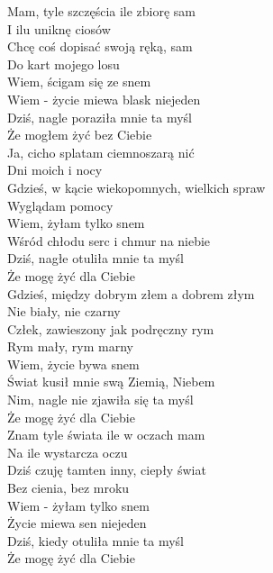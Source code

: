 
Mam, tyle szczęścia ile zbiorę sam \\
I ilu uniknę ciosów \\
Chcę coś dopisać swoją ręką, sam \\
Do kart mojego losu \\
Wiem, ścigam się ze snem \\
Wiem - życie miewa blask niejeden \\
Dziś, nagle poraziła mnie ta myśl \\
Że mogłem żyć bez Ciebie \\
\hops
Ja, cicho splatam ciemnoszarą nić \\
Dni moich i nocy \\
Gdzieś, w kącie wiekopomnych, wielkich spraw \\
Wyglądam pomocy \\
Wiem, żyłam tylko snem \\
Wśród chłodu serc i chmur na niebie \\
Dziś, nagłe otuliła mnie ta myśl \\
Że mogę żyć dla Ciebie \\
\hops
Gdzieś, między dobrym złem a dobrem złym \\
Nie biały, nie czarny \\
Człek, zawieszony jak podręczny rym \\
Rym mały, rym marny \\
Wiem, życie bywa snem \\
Świat kusił mnie swą Ziemią, Niebem \\
Nim, nagle nie zjawiła się ta myśl \\
Że mogę żyć dla Ciebie \\
\hops
Znam tyle świata ile w oczach mam \\
Na ile wystarcza oczu \\
Dziś czuję tamten inny, ciepły świat \\
Bez cienia, bez mroku \\
Wiem - żyłam tylko snem \\
Życie miewa sen niejeden \\
Dziś, kiedy otuliła mnie ta myśl \\
Że mogę żyć dla Ciebie 